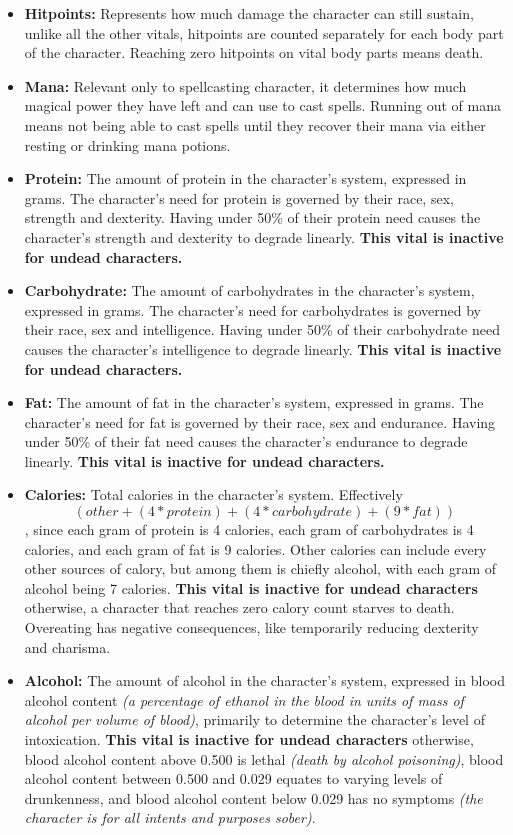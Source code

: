 \documentclass[tikz,openany,11pt,a4paper]{book}
\begin{document}
\begin{itemize}
\item \textbf{Hitpoints:} Represents how much damage the character can still sustain, unlike all the other vitals, hitpoints are counted separately for each body part of the character. Reaching zero hitpoints on vital body parts means death.
\item \textbf{Mana:} Relevant only to spellcasting character, it determines how much magical power they have left and can use to cast spells. Running out of mana means not being able to cast spells until they recover their mana via either resting or drinking mana potions.
\item \textbf{Protein:} The amount of protein in the character's system, expressed in grams. The character's need for protein is governed by their race, sex, strength and dexterity. Having under 50\% of their protein need causes the character's strength and dexterity to degrade linearly. \textbf{This vital is inactive for undead characters.}
\item \textbf{Carbohydrate:} The amount of carbohydrates in the character's system, expressed in grams. The character's need for carbohydrates is governed by their race, sex and intelligence. Having under 50\% of their carbohydrate need causes the character's intelligence to degrade linearly. \textbf{This vital is inactive for undead characters.}
\item \textbf{Fat:} The amount of fat in the character's system, expressed in grams. The character's need for fat is governed by their race, sex and endurance. Having under 50\% of their fat need causes the character's endurance to degrade linearly. \textbf{This vital is inactive for undead characters.}
\item \textbf{Calories:} Total calories in the character's system. Effectively \[(other+(4*protein)+(4*carbohydrate)+(9*fat))\], since each gram of protein is 4 calories, each gram of carbohydrates is 4 calories, and each gram of fat is 9 calories. Other calories can include every other sources of calory, but among them is chiefly alcohol, with each gram of alcohol being 7 calories. \textbf{This vital is inactive for undead characters} \textemdash otherwise, a character that reaches zero calory count starves to death. Overeating has negative consequences, like temporarily reducing dexterity and charisma.
\item \textbf{Alcohol:} The amount of alcohol in the character's system, expressed in blood alcohol content \textit{(a percentage of ethanol in the blood in units of mass of alcohol per volume of blood)}, primarily to determine the character's level of intoxication. \textbf{This vital is inactive for undead characters} \textemdash otherwise, blood alcohol content above 0.500 is lethal \textit{(death by alcohol poisoning)}, blood alcohol content between 0.500 and 0.029 equates to varying levels of drunkenness, and blood alcohol content below 0.029 has no symptoms \textit{(the character is for all intents and purposes sober)}.

\end{itemize}
\end{document}
